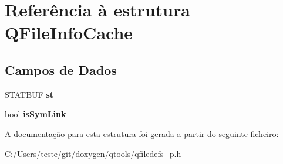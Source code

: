 \hypertarget{struct_q_file_info_cache}{\section{Referência à estrutura Q\-File\-Info\-Cache}
\label{struct_q_file_info_cache}
}
\subsection*{Campos de Dados}
\begin{DoxyCompactItemize}
\item 
\hypertarget{struct_q_file_info_cache_a21f1e6d622fa14c730fb8e618855cfcf}{S\-T\-A\-T\-B\-U\-F {\bfseries st}}\label{struct_q_file_info_cache_a21f1e6d622fa14c730fb8e618855cfcf}

\item 
\hypertarget{struct_q_file_info_cache_a6dbe7eabf3142c0462a2e9423f5afbee}{bool {\bfseries is\-Sym\-Link}}\label{struct_q_file_info_cache_a6dbe7eabf3142c0462a2e9423f5afbee}

\end{DoxyCompactItemize}


A documentação para esta estrutura foi gerada a partir do seguinte ficheiro\-:\begin{DoxyCompactItemize}
\item 
C\-:/\-Users/teste/git/doxygen/qtools/qfiledefs\-\_\-p.\-h\end{DoxyCompactItemize}
